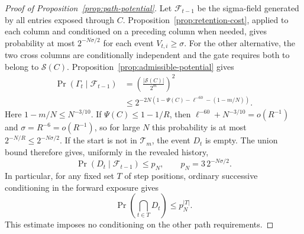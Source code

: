 \begin{proof}[Proof of Proposition~\ref{prop:path-potential}]
Let \(\mathcal F_{t-1}\) be the sigma-field generated by all entries
exposed through \(C\).
Proposition~\ref{prop:retention-cost}, applied to each column and
conditioned on a preceding column when needed, gives probability
at most \(2^{-N\sigma/2}\) for each event \(V_{t,i}\ge\sigma\).
For the other alternative, the two cross columns are conditionally
independent and the gate requires both to belong to \(\mathcal S(C)\).
Proposition~\ref{prop:admissible-potential} gives
\[
 \begin{split}
 \Pr(\Gamma_t\mid\mathcal F_{t-1})
 &=\left(\frac{|\mathcal S(C)|}{2^m}\right)^2\\
 &\le2^{-2N(1-\Psi(C)-\ell^{-60}-(1-m/N))}.
 \end{split}
\]
Here \(1-m/N\le N^{-3/10}\). If
\(\Psi(C)\le1-1/R\), then
\(\ell^{-60}+N^{-3/10}=o(R^{-1})\) and
\(\sigma=R^{-6}=o(R^{-1})\), so for large \(N\) this probability is
at most \(2^{-N/R}\le2^{-N\sigma/2}\). If the start is not in
\(\mathcal T_m\), the event \(D_t\) is empty. The union bound therefore
gives, uniformly in the revealed history,
\begin{equation}\label{eq:path-costly-step}
 \Pr(D_t\mid\mathcal F_{t-1})
 \le p_N,\qquad p_N=3\,2^{-N\sigma/2}.
\end{equation}
In particular, for any fixed set \(T\) of step positions, ordinary
successive conditioning in the forward exposure gives
\begin{equation}\label{eq:path-costly-set}
 \Pr\left(\bigcap_{t\in T}D_t\right)\le p_N^{|T|}.
\end{equation}
This estimate imposes no conditioning on the other path requirements.


\end{proof}
